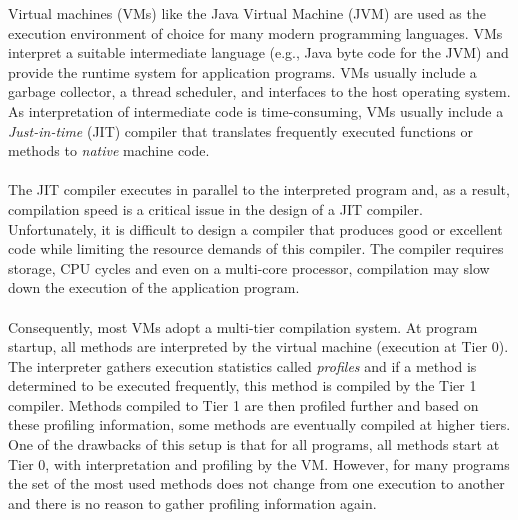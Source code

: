 Virtual machines (VMs) like the Java Virtual Machine (JVM) are used as the execution environment of choice for many modern programming languages. 
VMs interpret a suitable intermediate language (e.g., Java byte code for the JVM) and provide the runtime system for application programs. VMs usually include a garbage collector, a thread scheduler, and interfaces to the host operating system. 
As interpretation of intermediate code is time-consuming, VMs usually include a \textit{Just-in-time} (JIT) compiler that translates frequently executed functions or methods to \textit{native} machine code.
\\\\
The JIT compiler executes in parallel to the interpreted program and, as a result, compilation speed is a critical issue in the design of a JIT compiler.
Unfortunately, it is difficult to design a compiler that produces good or excellent code while limiting the resource demands of this compiler. The compiler requires storage, CPU cycles and even on a multi-core processor, compilation may slow down the execution of the application program.
\\\\
Consequently, most VMs adopt a multi-tier compilation system.
At program startup, all methods are interpreted by the virtual machine (execution at Tier 0). The interpreter gathers execution statistics called \textit{profiles} and if a method is determined to be executed frequently, this method is compiled by the Tier 1 compiler. Methods compiled to Tier 1 are then profiled further and based on these profiling information, some methods are eventually compiled at higher tiers.
One of the drawbacks of this setup is that for all programs, all methods start at Tier 0, with interpretation and profiling by the VM. However, for many programs the set of the most used methods does not change from one execution to another and there is no reason to gather profiling information again. 
